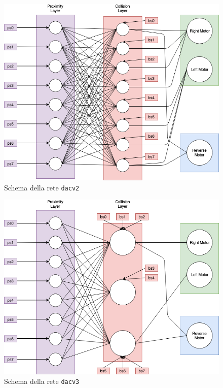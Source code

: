 \begin{figure}[H]
    \centering
    \includegraphics[scale=0.45]{figures/NetVersion2.png}
    \caption{Schema della rete \texttt{dacv2}}
    \label{fig:dacv2}
\end{figure}

\begin{figure}[H]
    \centering
    \includegraphics[scale=0.45]{figures/NetVersion3.png}
    \caption{Schema della rete \texttt{dacv3}}
    \label{fig:Dacv3}
\end{figure}

